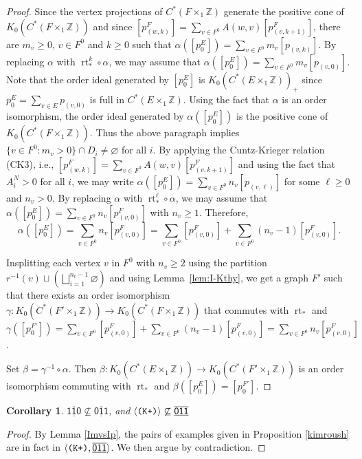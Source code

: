\documentclass[12pt]{amsbook}%
\newcommand{\lt}{\operatorname{rt}}
\newtheorem{corol}[theor]{Corollary}
\theoremstyle{defin}
\theoremstyle{remark}
\numberwithin{equation}{chapter}
\numberwithin{theor}{section}
\newcommand{\ZZ}{\mathbb{Z}}
\newcommand{\xyzrel}[1]{\mbox{$\overline{\underline{\mathsf{ #1}}}$}}
\newcommand{\KKKp}{\mbox{\texttt{\textup{(K+)}}}}
\renewcommand{\emptyset}{\varnothing}
\begin{document}
\begin{proof}
Since the vertex projections of $C^*(F\times_1\ZZ)$ generate the positive cone of $K_0 ( C^*(F\times_1\ZZ))$ and since $[p_{(w, k)}^F ] = \sum_{ v \in F^0 } A( w, v) [ p_{(v, k+1)}^F ]$, there are $m_v \geq 0$, $v \in F^0$ and $k \geq 0$ such that $\alpha( [p_0^E]) = \sum_{ v \in F^0 } m_v [ p_{(v, k)} ]$.  By replacing $\alpha$ with $\lt_*^{k} \circ \alpha$, we may assume that $\alpha( [p_0^E]) = \sum_{ v \in F^0 } m_v [ p_{(v, 0)} ]$.  Note that the order ideal generated by $[p_0^E]$ is $K_0(C^*(E\times_1\ZZ))_+$  since $p_0^E = \sum_{ v \in E } p_{(v,0)}$ is full in $C^*(E\times_1\ZZ)$.  Using the fact that $\alpha$ is an order isomorphism, the order ideal generated by $\alpha( [p_0^E])$ is the positive cone of $K_0 ( C^*(F\times_1\ZZ))$.  Thus the above paragraph implies $\{  v \in F^0 : m_v > 0 \} \cap D_i \neq \emptyset$ for all $i$.  By applying the Cuntz-Krieger relation (CK3), i.e.,  $[p_{(w, k)}^F ] = \sum_{ v \in F^0 } A( w, v) [ p_{(v, k+1)}^F ]$ and using the fact that $A_i^N > 0$ for all $i$, we may write $\alpha( [p_0^E]) = \sum_{ v \in F^0 } n_v [ p_{(v, \ell)} ]$ for some $\ell \geq 0$ and $n_v > 0$.  By replacing $\alpha$ with $\lt_*^{\ell } \circ \alpha$, we may assume that $\alpha ( [ p_0^E ] ) =  \sum_{ v \in F^0 } n_v [ p_{(v,0)}^F ]$ with $n_v \geq 1$.  Therefore,
$$\alpha( [p_0^E ] ) = \sum_{ v \in F^0 } n_v [ p_{(v,0)}^F ] = \sum_{ v \in F^0 } [ p_{(v,0)}^F ] +  \sum_{ v \in F^0 } (n_v - 1) [ p_{(v,0)}^F ].$$

Insplitting each vertex $v$ in $F^0$ with $n_v \geq 2$ using the partition $r^{-1}(v) \sqcup \left( \bigsqcup_{ i = 1}^{n_v-1} \emptyset \right)$ and using Lemma~\ref{lem:I-Kthy}, we get a graph $F'$ such that there exists an order isomorphism $\gamma \colon K_0( C^*(F'\times_1 \ZZ)) \to K_0( C^*(F\times_1\ZZ))$ that commutes with $\lt_*$ and $\gamma( [ p_0^{F'} ] ) = \sum_{ v \in F^0 } [ p_{(v,0)}^F ] +  \sum_{ v \in F^0 } (n_v - 1) [ p_{(v,0)}^F ] = \sum_{ v \in F^0 } n_v [ p_{(v,0)}^F ]$.  

Set $\beta=  \gamma^{-1} \circ \alpha$.  Then  $\beta \colon K_0( C^*(E\times_1\ZZ)) \to K_0( C^*(F'\times_1 \ZZ))$ is an order isomorphism commuting with $\lt_*$ and $\beta( [p_0^{E}]) = [ p_0^{F'} ]$.
\end{proof}

\begin{corol} \label{kimroushplus}$\xyzrel{110}\not\subseteq \xyzrel{011}$, and $\langle\KKKp\rangle\not\subseteq \xyzrel{011}$
\end{corol}
\begin{proof}
By Lemma \ref{ImvsIp}, the pairs of examples given in Proposition \ref{kimroush} are in fact in  $\langle\KKKp,\xyzrel{011}\rangle$. We then argue by contradiction.
\end{proof}
\end{document}
